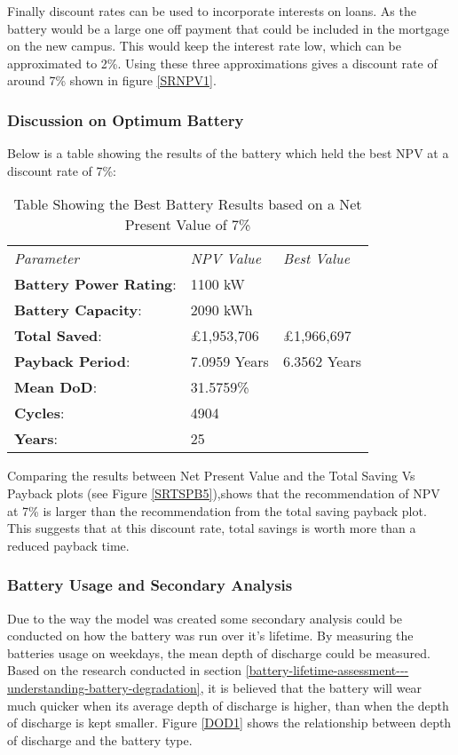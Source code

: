 Finally discount rates can be used to incorporate interests on loans. As
the battery would be a large one off payment that could be included in
the mortgage on the new campus. This would keep the interest rate low,
which can be approximated to 2\%. Using these three approximations gives
a discount rate of around 7\% shown in figure \ref{SRNPV1}.

\subsubsection{Discussion on Optimum
Battery}\label{discussion-on-optimum-battery}

Below is a table showing the results of the battery which held the best
NPV at a discount rate of 7\%:

\begin{table}[H]
\begin{tabular}{p{3.4cm}p{3cm}p{3cm}}
\textit{Parameter} & \textit{NPV Value} & \textit{Best Value}\\
\textbf{Battery Power Rating}:& 1100 kW\\
\textbf{Battery Capacity}:& 2090 kWh\\
\textbf{Total Saved}:& £1,953,706 & £1,966,697\\
\textbf{Payback Period}:& 7.0959 Years & 6.3562 Years\\
\textbf{Mean DoD}:& 31.5759\% \\
\textbf{Cycles}:& 4904\\
\textbf{Years}:& 25\\
\end{tabular}
\label{BestNPVTable}
\caption{Table Showing the Best Battery Results based on a Net Present Value of 7\%}
\end{table}

Comparing the results between Net Present Value and the Total Saving Vs
Payback plots (see Figure \ref{SRTSPB5}),shows that the recommendation
of NPV at 7\% is larger than the recommendation from the total saving
payback plot. This suggests that at this discount rate, total savings is
worth more than a reduced payback time.

\subsubsection{Battery Usage and Secondary
Analysis}\label{battery-usage-and-secondary-analysis}

Due to the way the model was created some secondary analysis could be
conducted on how the battery was run over it's lifetime. By measuring
the batteries usage on weekdays, the mean depth of discharge could be
measured. Based on the research conducted in section
\ref{battery-lifetime-assessment---understanding-battery-degradation},
it is believed that the battery will wear much quicker when its average
depth of discharge is higher, than when the depth of discharge is kept
smaller. Figure \ref{DOD1} shows the relationship between depth of
discharge and the battery type.

